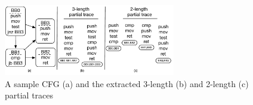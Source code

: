 \begin{figure}[]
\begin{center}\vspace{-3mm}
\includegraphics[width=7.5cm]{srj-figures/srj-partial_trace_ex.pdf} %
\caption{A sample CFG (a) and the extracted 3-length (b) and 2-length (c) partial traces}
\label{fig:example-cfg} \vspace{-2mm}
\end{center}
\end{figure}
%
